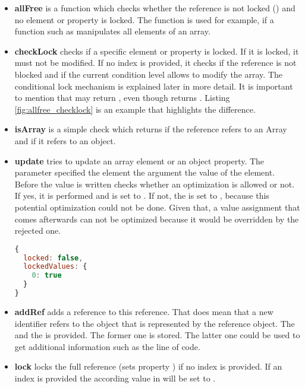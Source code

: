 \begin{itemize}

\item{\textbf{allFree}} is a function which checks whether the reference is not locked () and no element or property is locked. The function is used for example, if a function such as  manipulates all elements of an array.

\item{\textbf{checkLock}} checks if a specific element or property is locked. If it is locked, it must not be modified. If no index is provided, it checks if the reference is not blocked and if the current condition level allows to modify the array. The conditional lock mechanism is explained later in more detail. It is important to mention that  may return , even though  returns . Listing \ref{fig:allfree_checklock} is an example that highlights the difference.

\item{\textbf{isArray}} is a simple check which returns  if the reference refers to an Array and  if it refers to an object.

\item{\textbf{update}} tries to update an array element or an object property. The  parameter specified the element the  argument the value of the element. Before the value is written  checks whether an optimization is allowed or not. If yes, it is performed and  is set to . If not, the  is set to , because this potential optimization could not be done. Given that, a value assignment that comes afterwards can not be optimized because it would be overridden by the rejected one.

\begin{lstlisting}[label=fig:allfree_checklock,caption={Difference of \js{allFree} and \js{checkLock}. \js{allFree} returns \js{false}, \js{checkLock} returns \js{true} for any value including \js{undefined} except of \js{0}.},language=Javascript]
{
  locked: false,
  lockedValues: {
    0: true
  }
}
\end{lstlisting}

\item{\textbf{addRef}} adds a reference to this reference. That does mean that a new identifier refers to the object that is represented by the reference object. The  and the  is provided. The former one is stored. The latter one could be used to get additional information such as the line of code.

\item{\textbf{lock}} locks the full reference (sets property ) if no index is provided. If an index is provided the according value in  will be set to .
\end{itemize}

